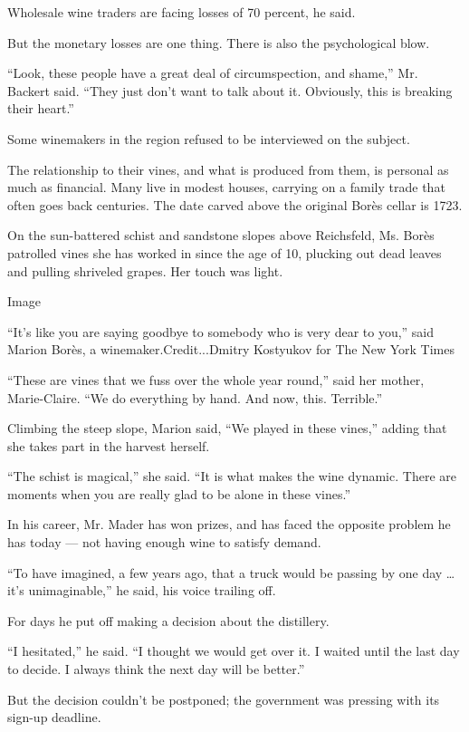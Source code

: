 Wholesale wine traders are facing losses of 70 percent, he said.

But the monetary losses are one thing. There is also the psychological
blow.

``Look, these people have a great deal of circumspection, and shame,''
Mr. Backert said. ``They just don't want to talk about it. Obviously,
this is breaking their heart.''

Some winemakers in the region refused to be interviewed on the subject.

The relationship to their vines, and what is produced from them, is
personal as much as financial. Many live in modest houses, carrying on a
family trade that often goes back centuries. The date carved above the
original Borès cellar is 1723.

On the sun-battered schist and sandstone slopes above Reichsfeld, Ms.
Borès patrolled vines she has worked in since the age of 10, plucking
out dead leaves and pulling shriveled grapes. Her touch was light.

Image

``It's like you are saying goodbye to somebody who is very dear to
you,'' said Marion Borès, a winemaker.Credit...Dmitry Kostyukov for The
New York Times

``These are vines that we fuss over the whole year round,'' said her
mother, Marie-Claire. ``We do everything by hand. And now, this.
Terrible.''

Climbing the steep slope, Marion said, ``We played in these vines,''
adding that she takes part in the harvest herself.

``The schist is magical,'' she said. ``It is what makes the wine
dynamic. There are moments when you are really glad to be alone in these
vines.''

In his career, Mr. Mader has won prizes, and has faced the opposite
problem he has today --- not having enough wine to satisfy demand.

``To have imagined, a few years ago, that a truck would be passing by
one day \ldots{} it's unimaginable,'' he said, his voice trailing off.

For days he put off making a decision about the distillery.

``I hesitated,'' he said. ``I thought we would get over it. I waited
until the last day to decide. I always think the next day will be
better.''

But the decision couldn't be postponed; the government was pressing with
its sign-up deadline.

